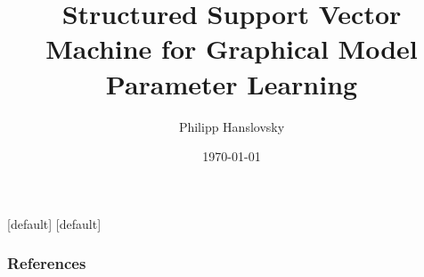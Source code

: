 





\title{Structured Support Vector Machine for Graphical Model Parameter Learning}

\author{Philipp Hanslovsky}
\date{\today}

[default]
[default]





\maketitle





\begin{frame}[allowframebreaks]
    \frametitle{References}
    \printbibliography
\end{frame}

\appendix %
\setcounter{finalframe}{\value{framenumber}}



% 

\setcounter{framenumber}{\value{finalframe}}





